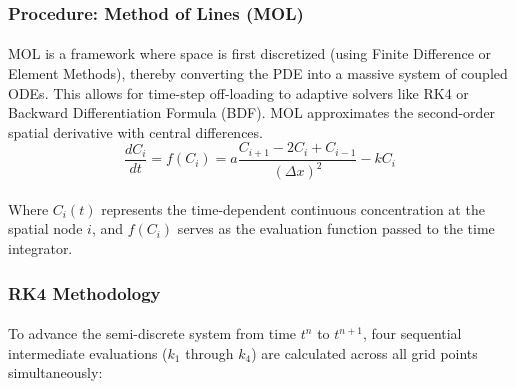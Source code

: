 \subsubsection*{Procedure: Method of Lines (MOL)} 
\paragraph{}
MOL is a framework where space is first discretized (using Finite Difference or Element Methods), thereby converting the PDE into a massive system of coupled ODEs. This allows for time-step off-loading to adaptive solvers like RK4 or Backward Differentiation Formula (BDF). MOL approximates the second-order spatial derivative with central differences.
\begin{equation*}
\frac{dC_i}{dt} = f(C_i) = a \frac{C_{i+1} - 2C_i + C_{i-1}}{(\Delta x)^2} - kC_i
\end{equation*}
\paragraph{}
Where $C_i(t)$ represents the time-dependent continuous concentration at the spatial node $i$, and $f(C_i)$ serves as the evaluation function passed to the time integrator. 

\subsubsection*{RK4 Methodology}
\paragraph{}
To advance the semi-discrete system from time $t^n$ to $t^{n+1}$, four sequential intermediate evaluations ($k_1$ through $k_4$) are calculated across all grid points simultaneously:

